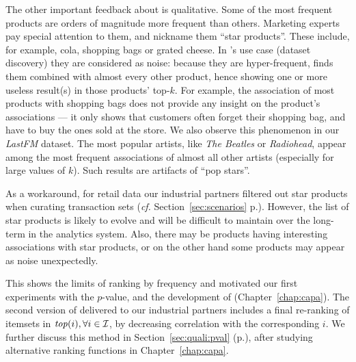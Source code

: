 The other important feedback about \toppi is qualitative.
Some of the most frequent products are orders of magnitude more frequent than others.
Marketing experts pay special attention to them, and nickname them ``star products''.
These include, for example, cola, shopping bags or grated cheese.
In \toppi's use case (dataset discovery) they are considered as noise:
because they are hyper-frequent, \toppi finds them combined with almost every other product,
hence showing one or more useless result(s) in those products' top-$k$.
For example, the association of most products with shopping bags does not provide any insight on
the product's associations ---
it only shows that customers often forget their shopping bag,
and have to buy the ones sold at the store.
We also observe this phenomenon in our {\em LastFM} dataset.
The most popular artists, like {\em The Beatles} or {\em Radiohead},
appear among the most frequent associations of almost all other artists (especially for large values of $k$).
Such results are artifacts of ``pop stars''.

As a workaround, for retail data our industrial partners filtered out star products
when curating transaction sets ({\em cf.} Section~\ref{sec:scenarios} p.\pageref{sec:scenarios}).
However, the list of star products is likely to evolve and will be difficult to maintain over the long-term
in the analytics system.
Also, there may be products having interesting associations with star products,
or on the other hand some products may appear as noise unexpectedly.

This shows the limits of ranking by frequency and
motivated our first experiments with the $p$-value, %
and the development of \capa (Chapter~\ref{chap:capa}).
The second version of \toppi delivered to our industrial partners includes
a final re-ranking of itemsets in $\mathit{top}(i), \forall i \in \cal I$,
by decreasing correlation with the corresponding $i$.
We further discuss this method in Section~\ref{sec:quali:pval} (p.\pageref{sec:quali:pval}),
after studying alternative ranking functions in Chapter~\ref{chap:capa}.


